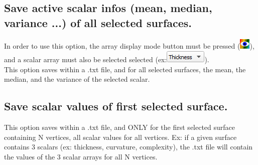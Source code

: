 \subsection{Save active scalar infos (mean, median, variance ...) of all selected surfaces.}
In order to use this option, the array display mode button must be pressed (\includegraphics[scale=0.7]{images/04/show_color_scale.png}), and a scalar array must also be selected selected (ex:\includegraphics[scale=0.5]{images/04/scalarcombo_scalar.png}).\\
This option saves within a .txt file, and for all selected surfaces, the mean, the median, and the variance of the selected scalar.

\subsection{Save scalar values of first selected surface.}
This option saves within a .txt file, and ONLY for the first selected surface containing N vertices, all scalar values for all vertices. Ex: if a given surface contains 3 scalars (ex: thickness, curvature, complexity), the .txt file will contain the values of the 3 scalar arrays for all N vertices. 